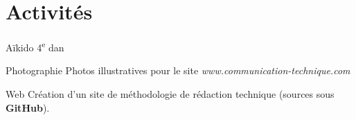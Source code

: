 \documentclass[12pt,a4paper,roman]{moderncv}
\begin{document}


\section{Activités}

\cvitem
    {Aïkido}
    {4\textsuperscript{e} dan}

\cvitem
    {Photographie}
    {Photos illustratives pour le site \textit{www.communication-technique.com}}

\cvitem
    {Web}
    {Création d'un site de méthodologie de rédaction technique (sources sous
      \textbf{GitHub}).}
\end{document}
